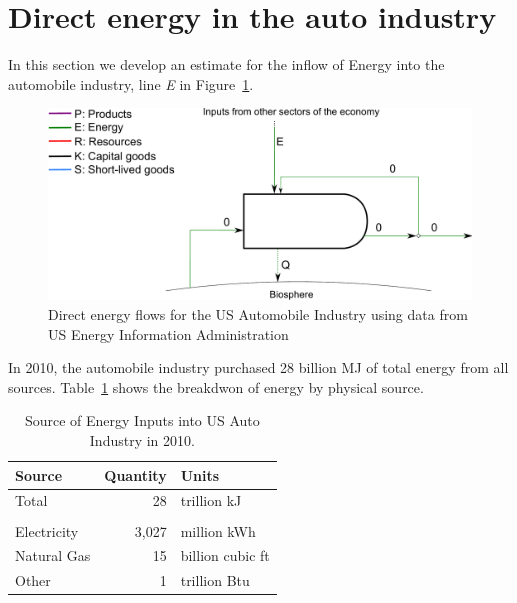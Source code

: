 \section{Direct energy in the auto industry}
\label{sec:energy_auto}
In this section we develop an estimate for the inflow of Energy into the automobile industry, line \emph{E} in Figure~\ref{fig:PERKS_energy_auto}.


\begin{figure}[!ht]
\centering
\includegraphics[width=0.8\linewidth]{Part_1/Chapter_Energy/images/PERKS_basic_unit_energy_auto_ind.pdf}
\caption[Direct energy flows for the US Automobile Industry]
{Direct energy flows for the US Automobile Industry using data from US Energy Information Administration}
\label{fig:PERKS_energy_auto}
\end{figure}


In 2010, the automobile industry purchased 28 billion MJ of total energy from all sources. 
Table~\ref{tab:auto_energy} shows the breakdwon of energy by
physical source. 



\begin{table}
\caption[Source of Energy Inputs into US Auto Industry in 2010]{Source of Energy Inputs into US Auto Industry in 2010.\cite[Table 7.6]{EIA:2014aa}}
\begin{center}
 \begin{tabular}{ l r l }
\toprule 
Source & Quantity &  Units \\
\midrule
Total  & 28 & trillion kJ \\
& & \\
Electricity & 3,027  & million kWh \\
Natural Gas & 15 & billion cubic ft \\
Other & 1 &  trillion Btu \\
\bottomrule
\end{tabular}
\end{center}
\label{tab:auto_energy}
\end{table}

